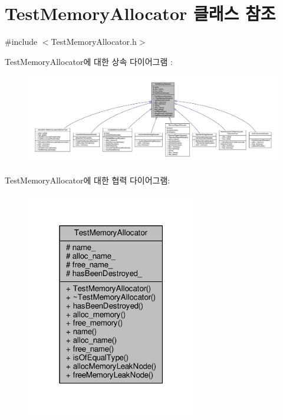 \hypertarget{class_test_memory_allocator}{}\section{Test\+Memory\+Allocator 클래스 참조}
\label{class_test_memory_allocator}


{\ttfamily \#include $<$Test\+Memory\+Allocator.\+h$>$}



Test\+Memory\+Allocator에 대한 상속 다이어그램 \+: 
\nopagebreak
\begin{figure}[H]
\begin{center}
\leavevmode
\includegraphics[width=350pt]{class_test_memory_allocator__inherit__graph}
\end{center}
\end{figure}


Test\+Memory\+Allocator에 대한 협력 다이어그램\+:
\nopagebreak
\begin{figure}[H]
\begin{center}
\leavevmode
\includegraphics[width=211pt]{class_test_memory_allocator__coll__graph}
\end{center}
\end{figure}
